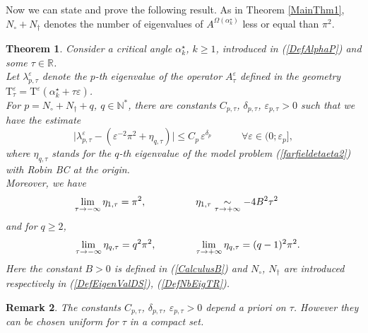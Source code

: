 \documentclass[11pt,a4paper]{article}
\newcommand{\eps}{\varepsilon}
\newcommand{\Om}{\Omega}
\newcommand{\N}{\mathbb{N}}
\newcommand{\R}{\mathbb{R}}
\newtheorem{theorem}{Theorem}[section]
\newtheorem{remark}[theorem]{Remark}
\begin{document}
\noindent Now we can state and prove the following result. As in Theorem \ref{MainThm1}, $N_\circ+N_\dagger$ denotes the number of eigenvalues of $A^{\Om(\alpha^\star_k)}$ less or equal than $\pi^2$.

\begin{theorem}\label{ThmModel1}
Consider a critical angle $\alpha_k^\star$, $k\ge 1$, introduced in (\ref{DefAlphaP}) and some $\tau\in\R$.\\ Let $\lambda^\eps_{p,\tau}$ denote the $p$-th eigenvalue of the operator $A^\eps_\tau$ defined in the geometry $\mathrm{T}^\eps_\tau=\mathrm{T}^\eps(\alpha^\star_k+\tau\eps)$.\\ For $p=N_\circ+N_\dagger+q$, $q\in\N^{\ast}$, there are  constants $C_{p,\tau}$, $\delta_{p,\tau}$, $\eps_{p,\tau}>0$ such that we have the estimate 
\[
\big|\lambda^\eps_{p,\tau}-(\eps^{-2}\pi^2+\eta_{q,\tau})\big|\le C_p\,\eps^{\delta_p}\qquad\quad\forall\eps\in(0;\eps_p],
\]
where $\eta_{q,\tau}$ stands for the $q$-th eigenvalue of the model problem (\ref{farfieldetaeta2}) with Robin BC at the origin.\\
[5pt]
Moreover, we have
\begin{equation}\label{FormulaModel1a}
\lim_{\tau\to-\infty}\eta_{1,\tau}=\pi^2,\qquad\qquad\quad \eta_{1,\tau}\underset{\tau\to+\infty}{\sim}-4B^2\tau^2\hspace{0.5cm}
\end{equation}
and for $q\ge2$,
\begin{equation}\label{FormulaModel1b}
\lim_{\tau\to-\infty}\eta_{q,\tau}=q^2\pi^2,\qquad\qquad \lim_{\tau\to+\infty}\eta_{q,\tau}=(q-1)^2\pi^2.\hspace{-0.3cm}
\end{equation}
Here the constant $B>0$ is defined in (\ref{CalculusB}) and $N_\circ$, $N_\dagger$ are introduced respectively in (\ref{DefEigenValDS}), (\ref{DefNbEigTR}).
\end{theorem}
\begin{remark}
The constants $C_{p,\tau}$, $\delta_{p,\tau}$, $\eps_{p,\tau}>0$ depend \textit{a priori} on $\tau$. However they can be chosen uniform for $\tau$ in a compact set.
\end{remark}
\end{document}
